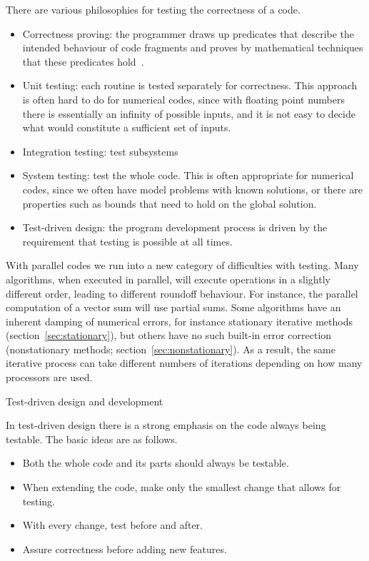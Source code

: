 There are various philosophies for testing the correctness of a code.
\begin{itemize}
\item Correctness proving: the programmer draws up predicates that
  describe the intended behaviour of code fragments and proves by
  mathematical techniques that these predicates
  hold~\cite{Hoare1969axiomatic,Dijkstra1974Programming}.
\item Unit testing: each routine is tested separately for
  correctness. This approach is often hard to do for numerical codes,
  since with floating point numbers there is essentially an infinity
  of possible inputs, and it is not easy to decide what would
  constitute a sufficient
  set of inputs.
\item Integration testing: test subsystems
\item System testing: test the whole code. This is often appropriate
  for numerical codes, since we often have model problems with known
  solutions, or there are properties such as bounds that need to hold
  on the global solution.
\item Test-driven design: the program development process is driven by
  the requirement that testing is possible at all times.
\end{itemize}

With parallel codes we run into a new category of difficulties with
testing. Many algorithms, when executed in parallel, will execute
operations in a slightly different order, leading to different
roundoff behaviour. For instance, the parallel computation of a vector
sum will use partial sums. Some algorithms have an inherent damping of
numerical errors, for instance stationary iterative methods
(section~\ref{sec:stationary}), but others have no such built-in error
correction (nonstationary methods;
section~\ref{sec:nonstationary}). As a result, the same iterative
process can take different numbers of iterations depending on how many
processors are used.
 
 {Test-driven design and development}

In test-driven design there is a strong emphasis on the code always
being testable. The basic ideas are as follows.
\begin{itemize}
\item Both the whole code and its parts should always be testable.
\item When extending the code, make only the smallest change that
  allows for testing.
\item With every change, test before and after.
\item Assure correctness before adding new features.
\end{itemize}


